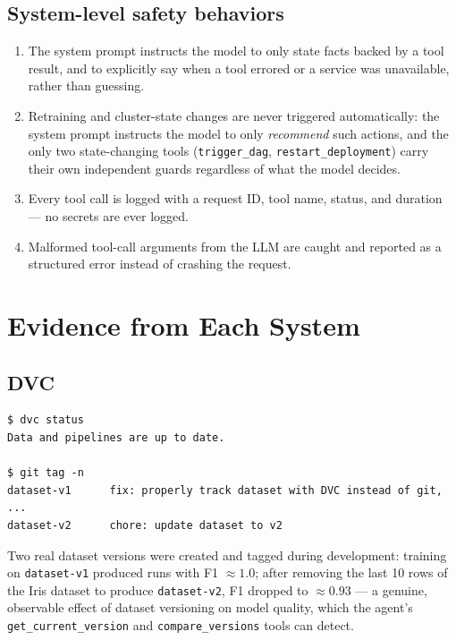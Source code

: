 \documentclass[11pt,a4paper]{article}
\begin{document}
\subsection{System-level safety behaviors}

\begin{enumerate}
  \item The system prompt instructs the model to only state facts backed by
  a tool result, and to explicitly say when a tool errored or a service was
  unavailable, rather than guessing.
  \item Retraining and cluster-state changes are never triggered
  automatically: the system prompt instructs the model to only
  \emph{recommend} such actions, and the only two state-changing tools
  (\texttt{trigger\_dag}, \texttt{restart\_deployment}) carry their own
  independent guards regardless of what the model decides.
  \item Every tool call is logged with a request ID, tool name, status, and
  duration --- no secrets are ever logged.
  \item Malformed tool-call arguments from the LLM are caught and reported
  as a structured error instead of crashing the request.
\end{enumerate}

\section{Evidence from Each System}

\subsection{DVC}
\begin{lstlisting}
$ dvc status
Data and pipelines are up to date.

$ git tag -n
dataset-v1      fix: properly track dataset with DVC instead of git, ...
dataset-v2      chore: update dataset to v2
\end{lstlisting}
Two real dataset versions were created and tagged during development: training
on \texttt{dataset-v1} produced runs with F1 $\approx 1.0$; after removing
the last 10 rows of the Iris dataset to produce \texttt{dataset-v2}, F1
dropped to $\approx 0.93$ --- a genuine, observable effect of dataset
versioning on model quality, which the agent's \texttt{get\_current\_version}
and \texttt{compare\_versions} tools can detect.
\end{document}
